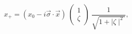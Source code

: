 \begin{equation}
x_{+}= (x_{0}-i\vec{\sigma}\cdot \vec{x})~
\left(
\begin{array}{c}
1\\
\zeta
\end{array}   \right)~
\frac{1}{\sqrt{1+\mid \zeta \mid^{2}}},
\end{equation}


